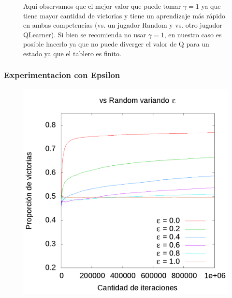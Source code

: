 \documentclass[10pt, a4paper]{article}
\begin{document}
\begin{figure}[H]
\begin{minipage}[c]{1\textwidth}
	\caption{Aquí observamos que el mejor valor que puede tomar $\gamma = 1$ ya que tiene mayor cantidad de victorias y tiene un aprendizaje más rápido en ambas competencias (vs. un jugador Random y vs. otro jugador QLearner). Si bien se recomienda no usar $\gamma = 1$, en nuestro caso es posible hacerlo ya que no puede diverger el valor de Q para un estado ya que el tablero es finito. }
  \end{minipage}
\end{figure}
\subsubsection{Experimentacion con Epsilon}
\begin{figure}[H]
  \begin{minipage}[c]{1\textwidth}
	\includegraphics[scale=0.2]{EpsilonR.png}

\end{minipage}
\end{figure}
\end{document}
